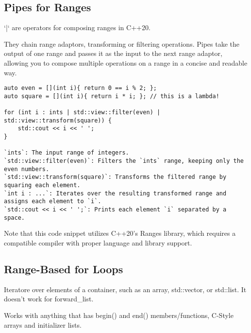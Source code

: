 \documentclass[openany]{report}
\begin{document}
\subsection{Pipes for Ranges}

`|` are operators for composing ranges in C++20.

They chain range adaptors, transforming or filtering operations.
Pipes take the output of one range and passes it as the input to the next range adaptor,
allowing you to compose multiple operations on a range in a concise and readable way.

\begin{verbatim}
auto even = [](int i){ return 0 == i % 2; };
auto square = [](int i){ return i * i; }; // this is a lambda!

for (int i : ints | std::view::filter(even) | std::view::transform(square)) {
    std::cout << i << ' ';
}

`ints`: The input range of integers.
`std::view::filter(even)`: Filters the `ints` range, keeping only the even numbers.
`std::view::transform(square)`: Transforms the filtered range by squaring each element.
`int i : ...`: Iterates over the resulting transformed range and assigns each element to `i`.
`std::cout << i << ' ';`: Prints each element `i` separated by a space.
\end{verbatim}

Note that this code snippet utilizes C++20's Ranges library, which requires a compatible compiler with proper language and library support.

\subsection{Range-Based for Loops}


Iteratore over elements of a container, such as an array, std::vector, or std::list. It doesn't work for forward\_list.


Works with anything that has begin()
and end() members/functions, C-Style arrays and initializer lists.
\end{document}
